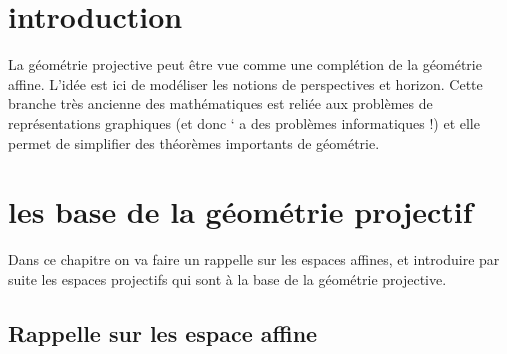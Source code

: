 \documentclass[12pt]{report}
\begin{document}
\chapter*{introduction}
La géométrie projective peut être vue comme une complétion de la géométrie affine.
L'idée est ici de modéliser les notions de perspectives et horizon. Cette branche très
ancienne des mathématiques est reliée aux problèmes de représentations graphiques
(et donc ` a des problèmes informatiques !) et elle permet de simplifier des théorèmes
importants de géométrie.
\chapter{les base de la géométrie projectif}
Dans ce chapitre on va faire un rappelle sur les espaces affines, et introduire par suite les espaces projectifs qui sont à la base de la géométrie projective.    
\section{Rappelle sur les espace affine}
\end{document}
